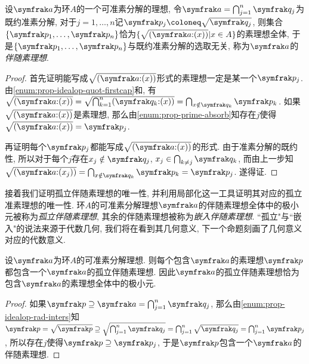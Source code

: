 
\begin{theorem}\label{prop:primuniq1}
  设$\ideal{a}$为环$A$的一个可准素分解的理想, 令$\ideal{a}=\bigcap_{j=1}^n \ideal{q}_j$为既约准素分解, 对于$j=1, \dotsc, n$记$\ideal{p}_j\coloneq \sqrt{\ideal{q}_j}$, 则集合$\{\ideal{p}_1, \dotsc, \ideal{p}_n\}$恰为$\{\sqrt{(\ideal{a}{:}(x))}\vert x\in A\}$的素理想全体, 于是$\{\ideal{p}_1, \dotsc, \ideal{p}_n\}$与既约准素分解的选取无关, 称为$\ideal{a}$的\emph{伴随素理想}.
\end{theorem}

\begin{proof}
  首先证明能写成$\sqrt{(\ideal{a}{:}(x))}$形式的素理想一定是某一个$\ideal{p}_j$. 由\ref{enum:prop-idealop-quot-firstcap}和, 有$\sqrt{(\ideal{a}{:}(x))}=\sqrt{\bigcap_{k=1}^n(\ideal{q}_k{:}(x))}=\bigcap_{x\notin\ideal{q}_k}\ideal{p}_k$. 如果$\sqrt{(\ideal{a}{:}(x))}$是素理想, 那么由\ref{enum:prop-prime-absorb}知存在$j$使得$\sqrt{(\ideal{a}{:}(x))}=\ideal{p}_j$.

  再证明每个$\ideal{p}_j$都能写成$\sqrt{(\ideal{a}{:}(x))}$的形式. 由于准素分解的既约性, 所以对于每个$j$存在$x_j\notin\ideal{q}_j$, $x_j\in\bigcap_{k\neq j}\ideal{q}_k$, 而由上一步知$\sqrt{(\ideal{a}{:}(x_j))}=\bigcap_{x\notin\ideal{q}_k}\ideal{p}_k=\ideal{p}_j$. 遂得证.
\end{proof}

接着我们证明孤立伴随素理想的唯一性, 并利用局部化这一工具证明其对应的孤立准素理想的唯一性. 环$A$的可准素分解理想$\ideal{a}$的伴随素理想全体中的极小元被称为\emph{孤立伴随素理想}, 其余的伴随素理想被称为\emph{嵌入伴随素理想}. ``孤立"与``嵌入"的说法来源于代数几何, 我们将在看到其几何意义, 下一个命题刻画了几何意义对应的代数意义.

\begin{proposition}\label{prop:isolatedprime}
  设$\ideal{a}$为环$A$的可准素分解理想. 则每个包含$\ideal{a}$的素理想$\ideal{p}$都包含一个$\ideal{a}$的孤立伴随素理想. 因此$\ideal{a}$的孤立伴随素理想恰为包含$\ideal{a}$的素理想全体中的极小元.
\end{proposition}

\begin{proof}
  如果$\ideal{p}\supseteq\ideal{a}=\bigcap_{j=1}^n\ideal{q}_j$, 那么由\ref{enum:prop-idealop-rad-inters}知$\ideal{p}=\sqrt{\ideal{p}}\supseteq\sqrt{\bigcap_{j=1}^n\ideal{q}_j}=\bigcap_{j=1}^n\sqrt{\ideal{q}_j}=\bigcap_{j=1}^n\ideal{p}_j$, 所以存在$j$使得$\ideal{p}\supseteq\ideal{p}_j$, 于是$\ideal{p}$包含一个$\ideal{a}$的伴随素理想.
\end{proof}

